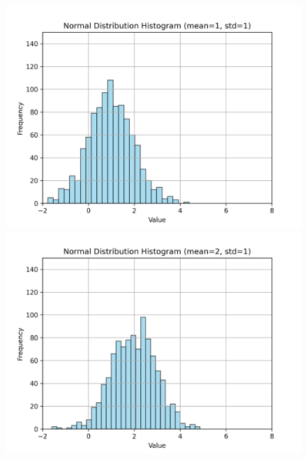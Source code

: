 \documentclass[a4paper,12pt]{article}
\begin{document}
\begin{figure}[h!]
    \centering
    \begin{minipage}{0.2\textwidth}
        \centering
        \includegraphics[width=\textwidth]{./Screenshots/Exercise6.1.png}
    \end{minipage}%
    \hfill
    \begin{minipage}{0.2\textwidth}
        \centering
        \includegraphics[width=\textwidth]{./Screenshots/Exercise6.2.png}
    \end{minipage}%
    \hfill
    \begin{minipage}{0.2\textwidth}
        \centering

\end{minipage}
\end{figure}
\end{document}
